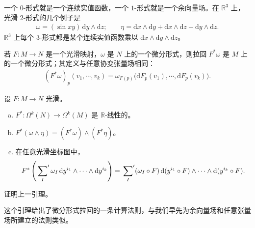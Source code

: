 \documentclass[../../main.tex]{subfiles}
\begin{document}
\begin{example}\label{example:ch14-15forms}
一个 $0$-形式就是一个连续实值函数，一个 $1$-形式就是一个余向量场。在 $\mathbb{R}^3$ 上，光滑 $2$-形式的几个例子是
\begin{align*}
\omega=(\sin xy)\,\mathrm{d}y\wedge\mathrm{d}z;\qquad
\eta=\mathrm{d}x\wedge\mathrm{d}y+\mathrm{d}x\wedge\mathrm{d}z+\mathrm{d}y\wedge\mathrm{d}z.
\end{align*}
$\mathbb{R}^3$ 上每个 $3$-形式都是某个连续实值函数乘以 $\mathrm{d}x\wedge\mathrm{d}y\wedge\mathrm{d}z$。
\end{example}

若 $F:M\to N$ 是一个光滑映射，$\omega$ 是 $N$ 上的一个微分形式，则拉回 $F^*\omega$ 是 $M$ 上的一个微分形式；其定义与任意协变张量场相同：
\begin{align*}
(F^*\omega)_p(v_1,\cdots ,v_k)=\omega_{F(p)}\bigl(\mathrm{d}F_p(v_1),\cdots ,\mathrm{d}F_p(v_k)\bigr).
\end{align*}

\begin{lemma}\label{lemma:ch14-pullback-forms}
设 $F:M\to N$ 光滑。
\begin{enumerate}[(a)]
\item $F^*:\Omega^k(N)\to\Omega^k(M)$ 是 $\mathbb{R}$-线性的。
\item $F^*(\omega\wedge\eta)=(F^*\omega)\wedge(F^*\eta)$。
\item 在任意光滑坐标图中，
\begin{align*}
F^*\left(\sideset{}{'}\sum_I\omega_I\,\mathrm{d}y^{i_1}\wedge\cdots\wedge\mathrm{d}y^{i_k}\right)
=\sideset{}{'}\sum_I(\omega_I\circ F)\,
\mathrm{d}(y^{i_1}\circ F)\wedge\cdots\wedge\mathrm{d}(y^{i_k}\circ F).
\end{align*}
\end{enumerate}
\end{lemma}

\begin{exercise}\label{exercise:ch14-17}
证明上一引理。
\end{exercise}

这个引理给出了微分形式拉回的一条计算法则，与我们早先为余向量场和任意张量场所建立的法则类似。
\end{document}

